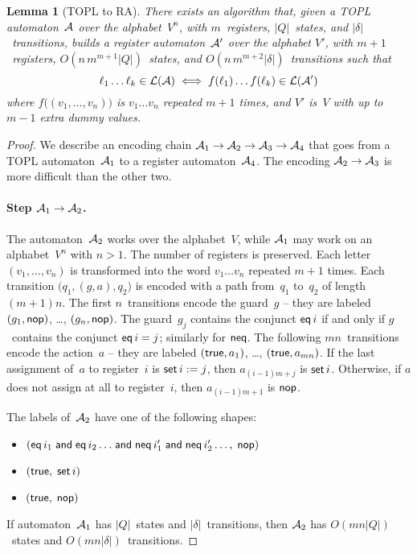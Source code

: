 \documentclass[9pt, preprint]{sigplanconf} %
\newtheorem{lemma}{Lemma}
\theoremstyle{definition}
\theoremstyle{remark}
\begin{document}
\begin{lemma}[TOPL to RA]\label{lemma:topl-to-ra}
There exists an algorithm that, given a TOPL automaton~${\cal A}$ over the alphabet~$V^n$, with $m$~registers, $|Q|$~states, and $|\delta|$~transitions, builds a register automaton~${\cal A}'$ over the alphabet $V'$, with $m+1$~registers, $O(n\,m^{m+1}|Q|)$~states, and $O(n\,m^{m+2}|\delta|)$~transitions such that
\[\ell_1\ldots \ell_k\in{\cal L}({\cal A}) \iff
  f(\ell_1)\ldots f(\ell_k)\in{\cal L}({\cal A}') \]
where $f\bigl((v_1,\ldots,v_n)\bigr)$ is $v_1\ldots v_n$ repeated $m+1$ times, and $V'$ is~$V$ with up to $m-1$ extra dummy values.
\end{lemma}
\begin{proof}
We describe an encoding chain ${\cal A}_1\to{\cal A}_2\to{\cal A}_3\to{\cal A}_4$ that goes from a TOPL automaton~${\cal A}_1$ to a register automaton~${\cal A}_4$.
The encoding ${\cal A}_2\to{\cal A}_3$ is more difficult than the other two.

\paragraph{Step ${\cal A}_1\to{\cal A}_2$.}
The automaton~${\cal A}_2$ works over the alphabet~$V$, while ${\cal A}_1$ may work on an alphabet~$V^n$ with $n>1$.
The number of registers is preserved.
Each letter $(v_1,\ldots,v_n)$ is transformed into the word $v_1\ldots v_n$ repeated $m+1$ times.
Each transition $\bigl(q_1,(g,a),q_2\bigr)$ is encoded with a path from~$q_1$ to~$q_2$ of length $(m+1)n$.
The first $n$~transitions encode the guard~$g$ -- they are labeled $(g_1,{\sf nop})$, \dots, $(g_n,{\sf nop})$.
The guard~$g_j$ contains the conjunct ${\sf eq}\,i$ if and only if $g$~contains the conjunct ${\sf eq}\,i=j$; similarly for ${\sf neq}$.
The following $mn$~transitions encode the action~$a$ -- they are labeled $({\sf true}, a_1)$, \dots, $({\sf true}, a_{mn})$.
If the last assignment of~$a$ to register~$i$ is ${\sf set}\,i:=j$, then $a_{(i-1)m+j}$ is ${\sf set}\,i$.
Otherwise, if $a$ does not assign at all to register~$i$, then $a_{(i-1)m+1}$ is ${\sf nop}$.

The labels of~${\cal A}_2$ have one of the following shapes:
\begin{itemize}
\item $({\sf eq}\,i_1\mathrel{\sf and}{\sf eq}\,i_2\ldots
  \mathrel{\sf and}{\sf neq}\,i'_1\mathrel{\sf and}{\sf neq}\,i'_2\ldots,\;
  {\sf nop})$
\item $({\sf true},\;{\sf set}\,i)$
\item $({\sf true},\;{\sf nop})$
\end{itemize}
If automaton~${\cal A}_1$ has $|Q|$~states and $|\delta|$~transitions, then ${\cal A}_2$ has $O(mn|Q|)$~states and $O(mn|\delta|)$~transitions.


\end{proof}
\end{document}
